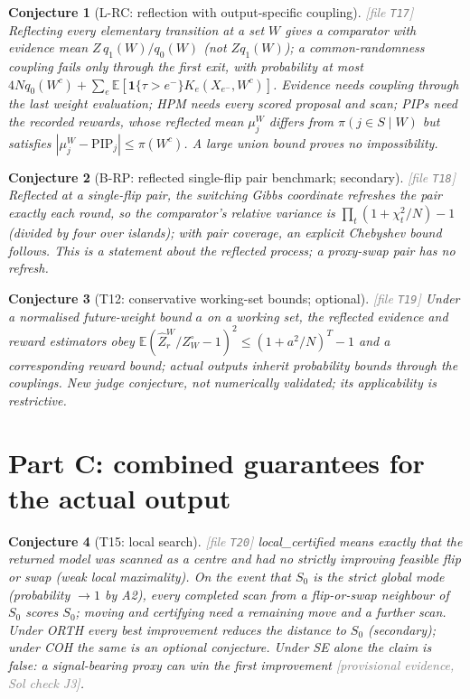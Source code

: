 \documentclass[11pt,a4paper]{article}
\theoremstyle{plain}
\newtheorem{conjecture}{Conjecture}[section]
\theoremstyle{definition}
\theoremstyle{remark}
\newcommand{\E}{\mathbb{E}}
\newcommand{\Sz}{S_0}
\newcommand{\PIP}{\mathrm{PIP}}
\newcommand{\Zhat}{\widehat Z}
\newcommand{\ind}[1]{\mathbf{1}\{#1\}}
\newcommand{\code}[1]{\textsf{#1}}
\newcommand{\provisional}[1]{\textcolor{gray}{[provisional evidence, Sol check #1]}}
\newcommand{\thfile}[1]{\textcolor{gray}{\footnotesize[file \texttt{#1}]}}
\begin{document}
\begin{conjecture}[L-RC: reflection with output-specific coupling]\thfile{T17}
Reflecting every elementary transition at a set $W$ gives a comparator with evidence mean $Z\,q_1(W)/q_0(W)$ (not $Zq_1(W)$); a common-randomness coupling fails only through the first exit, with probability at most $4Nq_0(W^c)+\sum_e\E[\ind{\tau>e^-}K_e(X_{e^-},W^c)]$. Evidence needs coupling through the last weight evaluation; HPM needs every scored proposal and scan; PIPs need the recorded rewards, whose reflected mean $\mu_j^W$ differs from $\pi(j\in S\mid W)$ but satisfies $|\mu_j^W-\PIP_j|\le\pi(W^c)$. A large union bound proves no impossibility.
\end{conjecture}

\begin{conjecture}[B-RP: reflected single-flip pair benchmark; secondary]\thfile{T18}
Reflected at a single-flip pair, the switching Gibbs coordinate refreshes the pair exactly each round, so the comparator's relative variance is $\prod_t(1+\chi_t^2/N)-1$ (divided by four over islands); with pair coverage, an explicit Chebyshev bound follows. This is a statement about the reflected process; a proxy-swap pair has no refresh.
\end{conjecture}

\begin{conjecture}[T12: conservative working-set bounds; optional]\thfile{T19}
Under a normalised future-weight bound $a$ on a working set, the reflected evidence and reward estimators obey $\E(\Zhat^W_r/Z_W^\circ-1)^2\le(1+a^2/N)^T-1$ and a corresponding reward bound; actual outputs inherit probability bounds through the couplings. New judge conjecture, not numerically validated; its applicability is restrictive.
\end{conjecture}

\section{Part C: combined guarantees for the actual output}

\begin{conjecture}[T15: local search]\thfile{T20}
\code{local\_certified} means exactly that the returned model was scanned as a centre and had no strictly improving feasible flip or swap (weak local maximality). On the event that $\Sz$ is the strict global mode (probability $\to1$ by A2), every completed scan from a flip-or-swap neighbour of $\Sz$ scores $\Sz$; moving and certifying need a remaining move and a further scan. Under ORTH every best improvement reduces the distance to $\Sz$ (secondary); under COH the same is an optional conjecture. Under SE alone the claim is false: a signal-bearing proxy can win the first improvement \provisional{J3}.
\end{conjecture}
\end{document}
